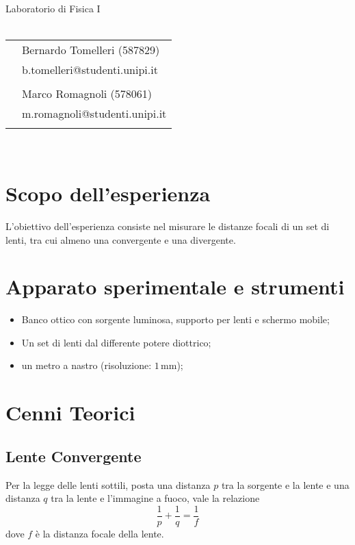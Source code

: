 \documentclass{article}[a4paper,11pt]
\begin{document}
\begin{titlepage}
	\begin{center}
		{\huge{Laboratorio di Fisica I}}\\\vspace*{7mm} %
		{\huge{\textbf{\thetitle}}}\\\vspace*{15mm}
		\begin{tabular}{ll}
		& Bernardo Tomelleri (587829) \\
		& b.tomelleri@studenti.unipi.it\\ \\
		& Marco Romagnoli (578061) \\
		& m.romagnoli@studenti.unipi.it \\ \\
		\end{tabular}\\\vspace*{5mm}
		{\thedate}
	\end{center}
\end{titlepage}
\makeatother
\restoregeometry
\section{Scopo dell'esperienza}
L'obiettivo dell'esperienza consiste nel misurare le distanze focali di un set di lenti, tra cui almeno una convergente e una divergente.
\section{Apparato sperimentale e strumenti}
\begin{itemize}
\item Banco ottico con sorgente luminosa, supporto per lenti e schermo mobile;
\item Un set di lenti dal differente potere diottrico;
\item un metro a nastro (risoluzione: $1 \, \si{\mm}$);
\end{itemize}

\section{Cenni Teorici}
\subsection*{Lente Convergente}
Per la legge delle lenti sottili, posta una distanza $p$ tra la sorgente e la lente e una distanza $q$ tra la lente e l'immagine a fuoco, vale la relazione
\begin{equation}\label{eq:focale}
\frac{1}{p} + \frac{1}{q} = \frac{1}{f}
\end{equation}
dove $f$ \`e la distanza focale della lente.\\
\end{document}
